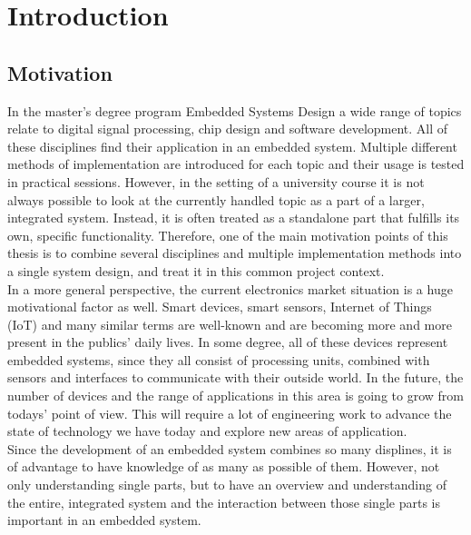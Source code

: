 \chapter{Introduction}
\label{cha:Introduction}

\section{Motivation}

In the master's degree program Embedded Systems Design a wide range of topics relate to digital signal processing, chip design and software development.
All of these disciplines find their application in an embedded system.
Multiple different methods of implementation are introduced for each topic and their usage is tested in practical sessions.
However, in the setting of a university course it is not always possible to look at the currently handled topic as a part of a larger, integrated system.
Instead, it is often treated as a standalone part that fulfills its own, specific functionality.
Therefore, one of the main motivation points of this thesis is to combine several disciplines and multiple implementation methods into a single system design, and treat it in this common project context.\\

In a more general perspective, the current electronics market situation is a huge motivational factor as well.
Smart devices, smart sensors, Internet of Things (IoT) and many similar terms are well-known and are becoming more and more present in the publics' daily lives.
In some degree, all of these devices represent embedded systems, since they all consist of processing units, combined with sensors and interfaces to communicate with their outside world.
In the future, the number of devices and the range of applications in this area is going to grow from todays' point of view.
This will require a lot of engineering work to advance the state of technology we have today and explore new areas of application.\\

Since the development of an embedded system combines so many displines, it is of advantage to have knowledge of as many as possible of them.
However, not only understanding single parts, but to have an overview and understanding of the entire, integrated system and the interaction between those single parts is important in an embedded system.\\

